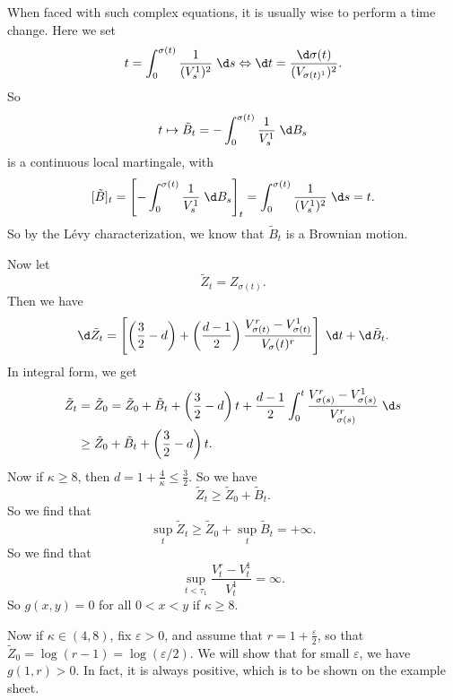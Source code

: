 \documentclass[a4paper]{article}
\begin{document}
When faced with such complex equations, it is usually wise to perform a time change. Here we set
\[
  t = \int_0^{\sigma(t)} \frac{1}{(V_s^1)^2} \;\d s \Leftrightarrow \d t = \frac{\d \sigma(t)}{(V_{\sigma(t)^1})^2}.
\]
So
\[
  t \mapsto \tilde{B}_t = - \int_0^{\sigma(t)} \frac{1}{V_s^1} \;\d B_s
\]
is a continuous local martingale, with
\[
  [\tilde{B}]_t = \left[ - \int_0^{\sigma(t)} \frac{1}{V_s^1} \;\d B_s\right]_t = \int_0^{\sigma(t)} \frac{1}{(V_s^1)^2}\;\d s = t.
\]
So by the L\'evy characterization, we know that $\tilde{B}_t$ is a Brownian motion.

Now let
\[
  \tilde{Z}_t = Z_{\sigma(t)}.
\]
Then we have
\[
  \d \tilde{Z}_t = \left[ \left(\frac{3}{2} - d\right) + \left(\frac{d - 1}{2}\right) \frac{V_{\sigma(t)}^r - V_{\sigma(t)}^1}{V_\sigma(t)^r}\right] \;\d t + \d \tilde{B}_t.
\]
In integral form, we get
\begin{align*}
  \tilde{Z}_t &= \tilde{Z}_0 = \tilde{Z}_0 + \tilde{B}_t + \left(\frac{3}{2} - d\right)t + \frac{d - 1}{2} \int_0^t \frac{V_{\sigma(s)}^r - V_{\sigma(s)}^1}{ V_{\sigma(s)}^r}\;\d s\\
  &\geq \tilde{Z}_0 + \tilde{B}_t + \left(\frac{3}{2} - d\right)t.
\end{align*}
Now if $\kappa \geq 8$, then $d = 1 + \frac{4}{\kappa} \leq \frac{3}{2}$. So we have
\[
  \tilde{Z}_t \geq \tilde{Z}_0 + \tilde{B}_t.
\]
So we find that
\[
  \sup_t \tilde{Z}_t \geq \tilde{Z}_0 + \sup_t \tilde{B}_t = + \infty.
\]
So we find that
\[
  \sup_{t < \tau_1} \frac{V_t^r - V_t^1}{V_t^1} = \infty.
\]
So $g(x, y) = 0$ for all $0 < x < y$ if $\kappa \geq 8$.

Now if $\kappa \in (4, 8)$, fix $\varepsilon > 0$, and assume that $r = 1 + \frac{\varepsilon}{2}$, so that $\tilde{Z}_0 = \log (r - 1) = \log (\varepsilon/2)$. We will show that for small $\varepsilon$, we have $g(1, r) > 0$. In fact, it is always positive, which is to be shown on the example sheet.
\end{document}
